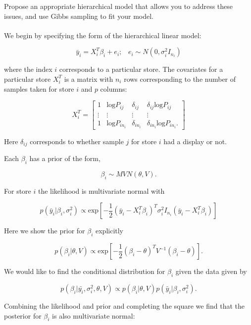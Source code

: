 \documentclass[11pt]{article}
\begin{document}
    Propose an appropriate hierarchical model that allows you to address these issues, and use Gibbs sampling to fit your model.\\
    \\

    We begin by specifying the form of the hierarchical linear model:

    $$\bar{y}_i = X_i^T \beta_i  + e_i; \hspace{10pt} e_i \sim N(0, \sigma_i^2 I_{n_i})$$

    \noindent where the index $i$ corresponds to a particular store. The covariates for a particular store $X_i^T$ is a matrix with $n_i$ rows corresponding to the number of samples taken for store $i$ and $p$ columns:

    $$X_i^T = \begin{bmatrix}1 & \text{log}P_{ij} & \delta_{ij} & \delta_{ij} \text{log}P_{ij} \\
    \vdots & \vdots & \vdots & \vdots \\
    1 & \text{log}P_{in_i} & \delta_{in_i} & \delta_{in_i} \text{log}P_{in_i}.
     \end{bmatrix}$$

    \noindent Here $\delta_{ij}$ corresponds to whether sample $j$ for store $i$ had a display or not. 

    Each $\beta_i$ has a prior of the form,

    $$\beta_i \sim MVN(\theta, V).$$

    \noindent For store $i$ the likelihood is multivariate normal with 

    $$p(\bar{y}_i | \beta_i, \sigma_i^2) \propto \text{exp}\left[-\frac{1}{2} (\bar{y}_i - X_i^T \beta_i)^T \sigma_i^2 I_{n_i} (\bar{y}_i - X_i^T \beta_i) \right]$$

    \noindent Here we show the prior for $\beta_i$ explicitly

    $$p(\beta_i | \theta, V) \propto \text{exp} \left[-\frac{1}{2} (\beta_i - \theta)^T V^{-1} (\beta_i - \theta) \right].$$

    \noindent We would like to find the conditional distribution for $\beta_i$ given the data given by

    $$p(\beta_i | \bar{y_i}, \sigma_i^2, \theta, V) \propto  p(\beta_i | \theta, V) p(\bar{y}_i | \beta_i, \sigma_i^2). $$

    \noindent Combining the likelihood and prior and completing the square we find that the posterior for $\beta_i$ is also multivariate normal:
\end{document}
